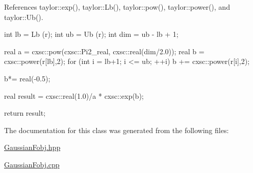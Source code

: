 \-References taylor\-::exp(), taylor\-::\-Lb(), taylor\-::pow(), taylor\-::power(), and taylor\-::\-Ub().


\begin{DoxyCode}
{
  int lb = Lb (r);
  int ub = Ub (r);
  int dim = ub - lb + 1;
  
  real a = cxsc::pow(cxsc::Pi2_real, cxsc::real(dim/2.0));
  real b = cxsc::power(r[lb],2);
  for (int i = lb+1; i <= ub; ++i) {
    b += cxsc::power(r[i],2);
  }
  
  b*= real(-0.5);
  
  real result = cxsc::real(1.0)/a * cxsc::exp(b);

  return result;
  
}
\end{DoxyCode}


\-The documentation for this class was generated from the following files\-:\begin{DoxyCompactItemize}
\item 
\hyperlink{GaussianFobj_8hpp}{\-Gaussian\-Fobj.\-hpp}\item 
\hyperlink{GaussianFobj_8cpp}{\-Gaussian\-Fobj.\-cpp}\end{DoxyCompactItemize}
